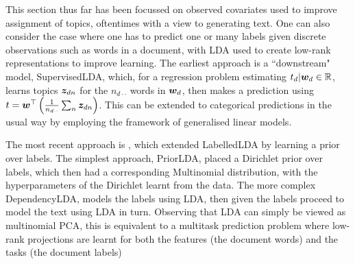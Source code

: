 This section thus far has been focussed on observed covariates used to improve assignment of topics, oftentimes with a view to generating text. One can also consider the case where one has to predict one or many labels given discrete observations such as words in a document, with LDA used to create low-rank representations to improve learning. The earliest approach is a ``downstream" model, SupervisedLDA\cite{Blei2008}, which, for a regression problem estimating $t_d|\bm w_d \in { \mathbb{R} }$, learns topics $\bm z_{dn}$ for the $n_{d\cdot\cdot}$ words in $\bm w_d$, then makes a prediction using $t = \bm w^\top\left(\frac{1}{ {n_{d\cdot\cdot}} }\sum_n \bm z_{dn}\right)$. This can be extended to categorical predictions in the usual way by employing the framework of generalised linear models.

The most recent approach is \cite{Rubin2011}, which extended LabelledLDA\cite{Ramage2009} by learning a prior over labels. The simplest approach, PriorLDA, placed a Dirichlet prior over labels, which then had a corresponding Multinomial distribution, with the hyperparameters of the Dirichlet learnt from the data. The more complex DependencyLDA, models the labels using LDA, then given the labels proceed to model the text using LDA in turn. Observing that LDA can simply be viewed as multinomial PCA, this is equivalent to a multitask prediction problem where low-rank projections are learnt for both the features (the document words) and the tasks (the document labels)


